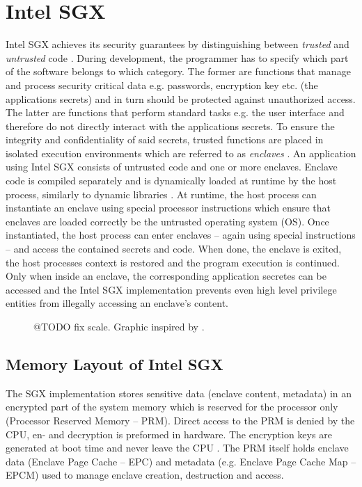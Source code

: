 \section{Intel SGX}
Intel SGX achieves its security guarantees by distinguishing between \textit{trusted} and \textit{untrusted} code \cite{IntelWebBasedTraining}. During development,
the programmer has to specify which part of the software belongs to which category. The former are functions that manage and process security critical data e.g. passwords,
encryption key etc. (the applications secrets) and in turn should be protected against unauthorized access. The latter are functions that perform standard tasks e.g. the
user interface and therefore do not directly interact with the applications secrets. To ensure the integrity and confidentiality of said secrets, trusted functions are 
placed in isolated execution environments which are referred to as \textit{enclaves} \cite{UseOfIntelSGX}. An application using Intel SGX consists of untrusted code and
one or more enclaves. Enclave code is compiled separately and is dynamically loaded at runtime by the host process, similarly to dynamic libraries \cite{Costan2016IntelSE}.
At runtime, the host process can instantiate an enclave using special processor instructions which ensure that enclaves are loaded correctly be the untrusted operating system
(OS). Once instantiated, the host process can enter enclaves -- again using special instructions -- and access the contained secrets and code. When done, the enclave is exited,
the host processes context is restored and the program execution is continued. Only when inside an enclave, the corresponding application secretes can be accessed and the
Intel SGX implementation prevents even high level privilege entities from illegally accessing an enclave's content.
\begin{figure}[h!]
    \centering
    \caption{@TODO fix scale. Graphic inspired by \cite{IntelSGXExplanation}.}
    \label{fig:enclaveCall}
\end{figure}

\subsection{Memory Layout of Intel SGX}
The SGX implementation stores sensitive data (enclave content, metadata) in an encrypted part of the system memory which is reserved for the processor only (Processor
Reserved Memory -- PRM). Direct access to the PRM is denied by the CPU, en- and decryption is preformed in hardware. The encryption keys are generated at boot time and
never leave the CPU \cite{IntelSGXExplanation}. The PRM itself holds enclave data (Enclave Page Cache -- EPC) and metadata (e.g. Enclave Page Cache Map -- EPCM) used 
to manage enclave creation, destruction and access.

